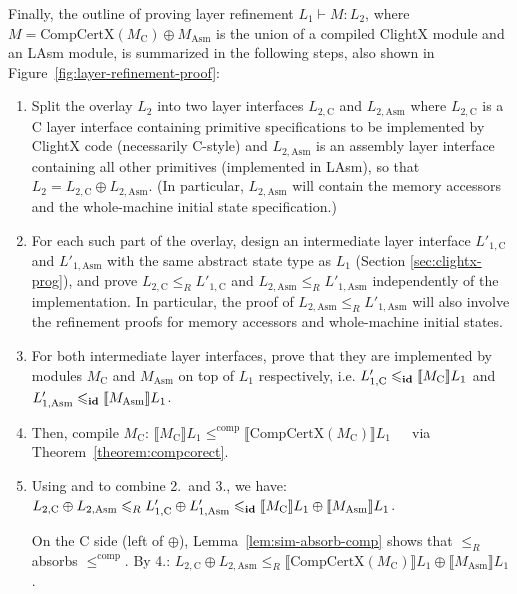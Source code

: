Finally, the outline of proving layer refinement $L_1 \vdash M : L_2$,
where $M = \textrm{CompCertX}(M_\text{C}) \oplus M_\text{Asm}$ is the union
of a compiled ClightX module and an LAsm module,
is summarized in the following steps, also shown in
Figure~\ref{fig:layer-refinement-proof}:
\begin{enumerate}   
\item Split the overlay $L_2$ into two layer interfaces
  $L_{2, \text{C}}$ and $L_{2, \text{Asm}}$ where $L_{2, \text{C}}$ is a C layer interface
  containing primitive specifications to be implemented by
  ClightX code (necessarily C-style) and $L_{2, \text{Asm}}$ is an assembly layer interface
  containing all other primitives (implemented in LAsm), so that $L_2 = L_{2, \text{C}} \oplus
  L_{2, \text{Asm}}$. (In particular, $L_{2, \text{Asm}}$ will contain the
  memory accessors and the whole-machine initial state specification.)
\item For each such part of the overlay, design an intermediate layer interface
  $L'_{1, \text{C}}$ and $L'_{1, \text{Asm}}$ with the same abstract state type as
  $L_1$ (\cf Section \ref{sec:clightx-prog}), and
  prove $L_{2, \text{C}} \leqslant_R L'_{1, \text{C}}$ and $L_{2, \text{Asm}} \leqslant_R
  L'_{1, \text{Asm}}$ independently of the implementation. In
  particular, the proof of $L_{2, \text{Asm}} \leqslant_R
  L'_{1, \text{Asm}}$ will also involve the refinement proofs for memory
  accessors and whole-machine initial states.
\item For both intermediate layer interfaces, prove that they are implemented by
  modules $M_\text{C}$ and $M_\text{Asm}$ on top of
  $L_1$ respectively, i.e.  $L'_{1, \text{C}} \leqslant_{\textbf{id}} \llbracket M_\text{C} \rrbracket L_1$ and
  $L'_{1,\text{Asm}} \leqslant_{\textbf{id}} \llbracket M_{\text{Asm}} \rrbracket L_1$.
\item Then, compile $M_\text{C}$:
$\llbracket M_\text{C}
  \rrbracket L_1 \leqslant^{\textrm{comp}} \llbracket
  \textrm{CompCertX}(M_\text{C}) \rrbracket L_1$~~~via Theorem~\ref{theorem:compcorect}.

\item
Using  and  to combine 2.\ and 3., we have:
$
L_{2, \text{C}} \oplus L_{2, \text{Asm}}
\leqslant_R
  L'_{1, \text{C}} \oplus L'_{1, \text{Asm}}
\leqslant_{\textbf{id}}
  \llbracket M_\text{C} \rrbracket L_1 \oplus
  \llbracket M_{\text{Asm}} \rrbracket L_1
$.

On the C side (left of $\oplus$), Lemma~\ref{lem:sim-absorb-comp} shows that
$\leqslant_R$ absorbs $\leqslant^{\textrm{comp}}$.  By 4.:
$
L_{2, \text{C}} \oplus L_{2, \text{Asm}} \leqslant_R
  \llbracket \textrm{CompCertX}(M_\text{C}) \rrbracket L_1 \oplus 
  \llbracket M_{\text{Asm}} \rrbracket L_1
$.


\end{enumerate}
